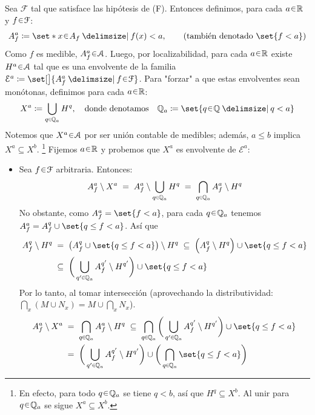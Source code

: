 \begin{sol}
Sea $\mathcal{F}$ tal que satisface las hipótesis de (F). Entonces definimos, para cada $a\en\mathbb{R}$ y $f\en\mathcal{F}$:
\[
A^a_f \coloneq \set*{x\en A_f \given f(x) < a},
\qquad \text{(también denotado $\set{f<a}$)}
\]
Como $f$ es medible, $A^a_f\en\mathcal{A}$. Luego, por localizabilidad, para cada $a\en\mathbb{R}$ existe $H^a \en\mathcal{A}$ tal que es una envolvente de la familia $\mathcal{E}^a \coloneq \set[\big]{A^a_f \given f\en\mathcal{F} }$. Para "forzar" a que estas envolventes sean monótonas, definimos para cada $a\en\mathbb{R}$:
\[
X^a \coloneq \bigcup_{q\en\mathbb{Q}_{a}} H^q,
\quad\text{donde denotamos}\quad
\mathbb{Q}_a \coloneq \set{q\en\mathbb{Q} \given q<a}
\]
Notemos que $X^a\en\mathcal{A}$ por ser unión contable de medibles; además, $a \leq b$ implica $X^a \subseteq X^b$.%
\footnote{
    En efecto, para todo $q\en\mathbb{Q}_a$ se tiene $q<b$, así que $H^q \subseteq X^b$. Al unir para $q\en\mathbb{Q}_a$ se sigue $X^a\subseteq X^b$.
}  
Fijemos $a\en\mathbb{R}$ y probemos que $X^a$ es envolvente de $\mathcal{E}^a$:
\begin{itemize}[leftmargin=1em]
\item 
Sea $f\en\mathcal{F}$ arbitraria. Entonces:
\[
A^a_f \setminus X^a 
\;=\; A^a_f\setminus\bigcup_{q\en\mathbb{Q}_a}H^q
\;=\; \bigcap_{q\en\mathbb{Q}_a} A^a_f\setminus H^q
\]
No obstante, como $A^a_f = \set{f<a}$, para cada $q\en\mathbb{Q}_a$ tenemos $A^a_f = A^q_f \cup \set{q \leq f < a}$. Así que
\begin{align*}
A^q_f \setminus H^q
&\;=\; \big(A^q_f \cup \set{q \leq f < a}\big) \setminus H^q
\;\subseteq\; \left(A^q_f\setminus H^q\right) \cup \set{q \leq f < a}\\
&\;\subseteq\; \bigg(\bigcup_{q'\en\mathbb{Q}_a} A^{q'}_f\setminus H^{q'}\bigg) \cup \set{q \leq f < a}
\end{align*}
Por lo tanto, al tomar intersección (aprovechando la distributividad: $\bigcap_x(M\cup N_x) = M \cup \bigcap_x N_x$).
\begin{equation}\label{eq:env1}
\begin{split}
A^a_f \setminus X^a 
&\;=\; \bigcap_{q\en\mathbb{Q}_a} A^a_f\setminus H^q
\;\subseteq\; \bigcap_{q\en\mathbb{Q}_a} \bigg(\bigcup_{q'\en\mathbb{Q}_a} A^{q'}_f\setminus H^{q'}\bigg) \cup \set{q \leq f < a}\\
&\;=\; \bigg(\bigcup_{q'\en\mathbb{Q}_a} A^{q'}_f\setminus H^{q'}\bigg) \cup \bigg(\bigcap_{q\en\mathbb{Q}_a}\set{q \leq f < a}\bigg)
\end{split}

\end{equation}
\end{itemize}
\end{sol}
